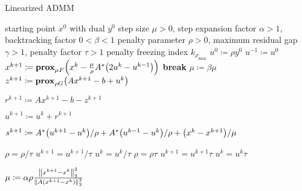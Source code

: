 \begin{algorithm}[tpb]
 \caption{Linearized ADMM}
 \label{alg:admmlin}
 \begin{algorithmic}
  \GIVEN starting point $x^0$ with dual $y^0$
  \GIVEN step size $\mu > 0$, step expansion factor $\alpha > 1$, backtracking factor $0 < \beta < 1$
  \GIVEN penalty parameter $\rho > 0$, maximum residual gap $\gamma > 1$, penalty factor $\tau > 1$
  \GIVEN penalty freezing index $k_{\rho_\text{max}}$
  \STATE $u^0 \coloneqq \rho y^0$
  \STATE $u^{-1} \coloneqq u^0$
  \REPEAT
   \REPEAT
    \STATE $x^{k+1} \coloneqq \prox_{\mu F}\paren*{x^k - \frac{\mu}{\rho} A^*\paren*{2u^k - u^{k-1}}}$
     \STATE \textbf{break}
    \ELSE
     \STATE $\mu \coloneqq \beta \mu$
    \ENDIF
   \UNTIL
   \STATE $z^{k+1} \coloneqq \prox_{\rho G}\paren*{Ax^{k+1} - b + u^k}$

   \STATE $r^{k+1} \coloneqq Ax^{k+1} - b - z^{k+1}$

   \STATE $u^{k+1} \coloneqq u^k + r^{k+1}$
   
   \STATE $s^{k+1} \coloneqq A^*\paren*{u^{k+1} - u^k}/\rho + A^*\paren*{u^{k-1} - u^k}/\rho + \paren*{x^k - x^{k+1}}/\mu$
   
     \STATE $\rho = \rho/\tau$
     \STATE $u^{k+1} = u^{k+1}/\tau$
     \STATE $u^k = u^k/\tau$
    \ENDIF
     \STATE $\rho = \rho\tau$
     \STATE $u^{k+1} = u^{k+1}\tau$
     \STATE $u^k = u^k\tau$
    \ENDIF
   \ENDIF
   
    \STATE $\mu \coloneqq \alpha \rho \frac{\norm{2}{x^{k+1} - x^k}^2}{\norm{2}{A\paren*{x^{k+1} - x^k}}^2}$
   \ENDIF
 \end{algorithmic}
\end{algorithm}%

